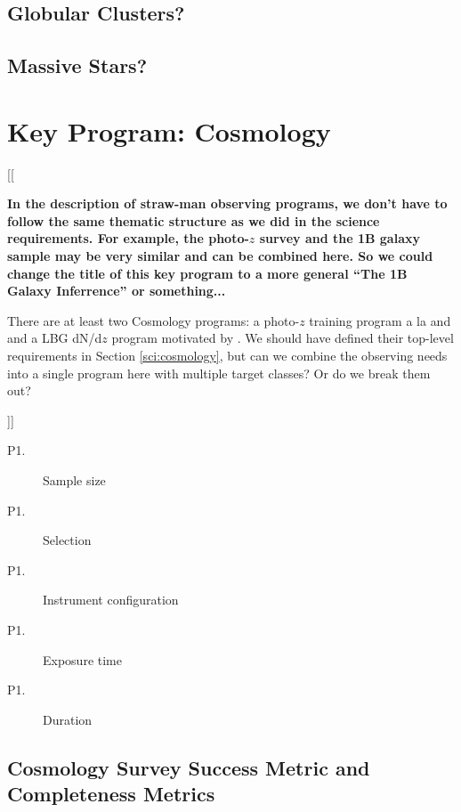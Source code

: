 \documentclass[preprint,11pt]{aastex}
\newcommand{\photoz}{photo-$z$}
\newcommand{\edit}[2][todo]{{\color{#1}[[{\bf #2}]]}}
\begin{document}
\subsection{Globular Clusters?}

\subsection{Massive Stars?}


\section{Key Program: Cosmology}\label{prog:cosmology}

\edit{In the description of straw-man observing programs, we don't have to follow the same thematic structure as we did in the science requirements.  For example, the \photoz{} survey and the 1B galaxy sample may be very similar and can be combined here.  So we could change the title of this key program to a more general ``The 1B Galaxy Inferrence'' or something...

There are at least two Cosmology programs: a \photoz{} training program a la \citet{newman15} and \citet{hemmati18} and a LBG dN/d$z$ program motivated by \citet{wilson19}.  We should have defined their top-level requirements in Section \ref{sci:cosmology}, but can we combine the observing needs into a single program here with multiple target classes?  Or do we break them out?}


\begin{description}

\item[P1.] Sample size
\item[P1.] Selection 
\item[P1.] Instrument configuration 
\item[P1.] Exposure time
\item[P1.] Duration

\end{description}

\subsection{Cosmology Survey Success Metric and Completeness Metrics}
\end{document}

